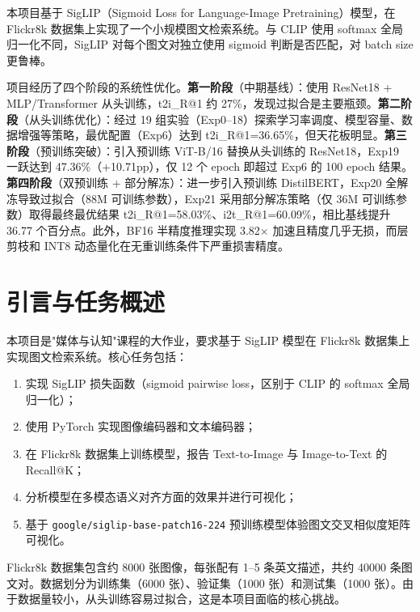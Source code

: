 \documentclass[12pt,a4paper]{article}
\begin{document}
{\linespread{1.3}\selectfont
本项目基于 SigLIP（Sigmoid Loss for Language-Image Pretraining）模型，在 Flickr8k 数据集上实现了一个小规模图文检索系统。与 CLIP 使用 softmax 全局归一化不同，SigLIP 对每个图文对独立使用 sigmoid 判断是否匹配，对 batch size 更鲁棒。

项目经历了四个阶段的系统性优化。\textbf{第一阶段}（中期基线）：使用 ResNet18 + MLP/Transformer 从头训练，t2i\_R@1 约 27\%，发现过拟合是主要瓶颈。\textbf{第二阶段}（从头训练优化）：经过 19 组实验（Exp0--18）探索学习率调度、模型容量、数据增强等策略，最优配置（Exp6）达到 t2i\_R@1=36.65\%，但天花板明显。\textbf{第三阶段}（预训练突破）：引入预训练 ViT-B/16 替换从头训练的 ResNet18，Exp19 一跃达到 47.36\%（+10.71pp），仅 12 个 epoch 即超过 Exp6 的 100 epoch 结果。\textbf{第四阶段}（双预训练 + 部分解冻）：进一步引入预训练 DistilBERT，Exp20 全解冻导致过拟合（88M 可训练参数），Exp21 采用部分解冻策略（仅 36M 可训练参数）取得最终最优结果 t2i\_R@1=58.03\%、i2t\_R@1=60.09\%，相比基线提升 36.77 个百分点。此外，BF16 半精度推理实现 3.82$\times$ 加速且精度几乎无损，而层剪枝和 INT8 动态量化在无重训练条件下严重损害精度。\par}

\newpage
\tableofcontents
\newpage

\section{引言与任务概述}

本项目是"媒体与认知"课程的大作业，要求基于 SigLIP 模型在 Flickr8k 数据集上实现图文检索系统。核心任务包括：

\begin{enumerate}[nosep]
    \item 实现 SigLIP 损失函数（sigmoid pairwise loss，区别于 CLIP 的 softmax 全局归一化）；
    \item 使用 PyTorch 实现图像编码器和文本编码器；
    \item 在 Flickr8k 数据集上训练模型，报告 Text-to-Image 与 Image-to-Text 的 Recall@K；
    \item 分析模型在多模态语义对齐方面的效果并进行可视化；
    \item 基于 \texttt{google/siglip-base-patch16-224} 预训练模型体验图文交叉相似度矩阵可视化。
\end{enumerate}

Flickr8k 数据集包含约 8000 张图像，每张配有 1--5 条英文描述，共约 40000 条图文对。数据划分为训练集（6000 张）、验证集（1000 张）和测试集（1000 张）。由于数据量较小，从头训练容易过拟合，这是本项目面临的核心挑战。
\end{document}
